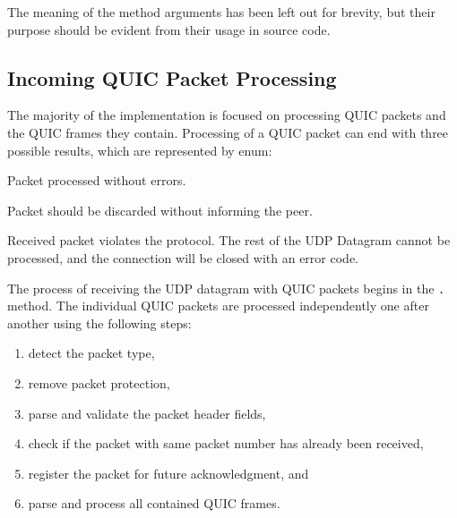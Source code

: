 The meaning of the method arguments has been left out for brevity, but their purpose should be
evident from their usage in source code.

\subsection{Incoming QUIC Packet Processing}

The majority of the \ManagedQuicConnection{} implementation is focused on processing QUIC packets
and the QUIC frames they contain. Processing of a QUIC packet can end with three possible results,
which are represented by \ProcessPacketResult{} enum:

\begin{itemize}

   Packet processed without errors.

   Packet should be discarded without informing the peer.

   Received packet violates the protocol. The rest of the UDP Datagram
cannot be processed, and the connection will be closed with an error code.

\end{itemize}

The process of receiving the UDP datagram with QUIC packets begins in the
\texttt{\ManagedQuicConnection{}.} method. The individual QUIC packets are
processed independently one after another using the following steps:

\begin{enumerate}

  \item detect the packet type,

  \item remove packet protection,

  \item parse and validate the packet header fields,

  \item check if the packet with same packet number has already been received,

  \item register the packet for future acknowledgment, and

  \item parse and process all contained QUIC frames.

\end{enumerate}

